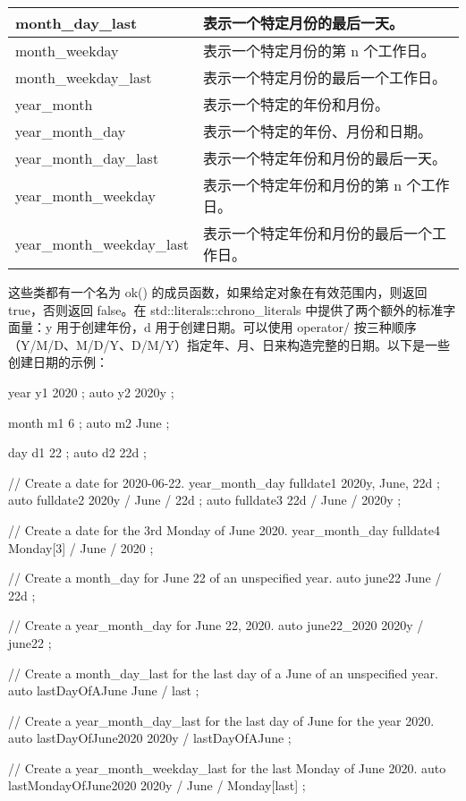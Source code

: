 \begin{longtable}{|l|l|}
month\_day\_last &
表示一个特定月份的最后一天。 \\ \hline
month\_weekday &
表示一个特定月份的第 n 个工作日。 \\ \hline
month\_weekday\_last &
表示一个特定月份的最后一个工作日。 \\ \hline
year\_month &
表示一个特定的年份和月份。 \\ \hline
year\_month\_day &
表示一个特定的年份、月份和日期。 \\ \hline
year\_month\_day\_last &
表示一个特定年份和月份的最后一天。 \\ \hline
year\_month\_weekday &
表示一个特定年份和月份的第 n 个工作日。 \\ \hline
year\_month\_weekday\_last &
表示一个特定年份和月份的最后一个工作日。 \\ \hline
\end{longtable}

这些类都有一个名为 ok() 的成员函数，如果给定对象在有效范围内，则返回 true，否则返回 false。在 std::literals::chrono\_literals 中提供了两个额外的标准字面量：y 用于创建年份，d 用于创建日期。可以使用 operator/ 按三种顺序（Y/M/D、M/D/Y、D/M/Y）指定年、月、日来构造完整的日期。以下是一些创建日期的示例：

\begin{cpp}
year y1 { 2020 };
auto y2 { 2020y };

month m1 { 6 };
auto m2 { June };

day d1 { 22 };
auto d2 { 22d };

// Create a date for 2020-06-22.
year_month_day fulldate1 { 2020y, June, 22d };
auto fulldate2 { 2020y / June / 22d };
auto fulldate3 { 22d / June / 2020y };

// Create a date for the 3rd Monday of June 2020.
year_month_day fulldate4 { Monday[3] / June / 2020 };

// Create a month_day for June 22 of an unspecified year.
auto june22 { June / 22d };

// Create a year_month_day for June 22, 2020.
auto june22_2020 { 2020y / june22 };

// Create a month_day_last for the last day of a June of an unspecified year.
auto lastDayOfAJune { June / last };

// Create a year_month_day_last for the last day of June for the year 2020.
auto lastDayOfJune2020 { 2020y / lastDayOfAJune };

// Create a year_month_weekday_last for the last Monday of June 2020.
auto lastMondayOfJune2020 { 2020y / June / Monday[last] };
\end{cpp}

